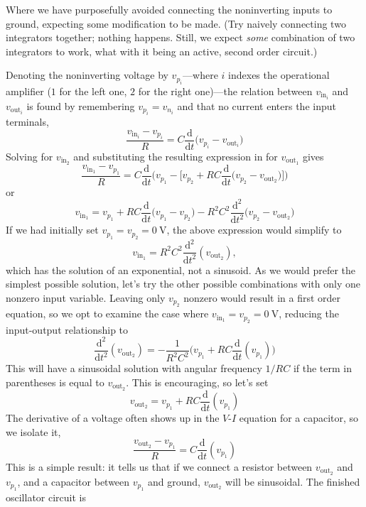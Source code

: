 \documentclass{article}
\begin{document}
	Where we have purposefully avoided connecting the noninverting inputs to ground, expecting some modification to be made. (Try naively connecting two integrators together; nothing happens. Still, we expect \textit{some} combination of two integrators to work, what with it being an active, second order circuit.)
	
	Denoting the noninverting voltage by $v_{p_i}$---where $i$ indexes the operational amplifier ($1$ for the left one, $2$ for the right one)---the relation between $v_{\text{in}_i}$ and $v_{\text{out}_i}$ is found by remembering $v_{p_i} = v_{n_i}$ and that no current enters the input terminals,
	\[
		\frac{v_{\text{in}_i} - v_{p_i}}{R} = C\frac{\mathrm{d}}{\mathrm{d}t}\Big(v_{p_i} - v_{\text{out}_i}\Big)
	\]
	Solving for $v_{\text{in}_2}$ and substituting the resulting expression in for $v_{\text{out}_1}$ gives
	\[
		\frac{v_{\text{in}_1} - v_{p_1}}{R} = C\frac{\mathrm{d}}{\mathrm{d}t}\Big(v_{p_1} - \Big[v_{p_2} + RC\frac{\mathrm{d}}{\mathrm{d}t}\Big(v_{p_2} - v_{\text{out}_2}\Big)\Big]\Big)
	\]
	or
	\[
		v_{\text{in}_1} = v_{p_1} + RC\frac{\mathrm{d}}{\mathrm{d}t}\Big(v_{p_1} - v_{p_2}\Big) - R^2C^2\frac{\mathrm{d}^2}{\mathrm{d}t^2}\Big(v_{p_2} - v_{\text{out}_2}\Big)
	\]
	If we had initially set $v_{p_1}=v_{p_2}=\SI{0}{\volt}$, the above expression would simplify to
	\[
		v_{\text{in}_1} = R^2C^2\frac{\mathrm{d}^2}{\mathrm{d}t^2}(v_{\text{out}_2}),
	\]
	which has the solution of an exponential, not a sinusoid. As we would prefer the simplest possible solution, let's try the other possible combinations with only one nonzero input variable. Leaving only $v_{p_2}$ nonzero would result in a first order equation, so we opt to examine the case where $v_{\text{in}_1} = v_{p_2} = \SI{0}{\volt}$, reducing the input-output relationship to
	\[
		 \frac{\mathrm{d}^2}{\mathrm{d}t^2}(v_{\text{out}_2}) = -\frac{1}{R^2C^2}\Big(v_{p_1} + RC\frac{\mathrm{d}}{\mathrm{d}t}(v_{p_1})\Big)
	\]
	This will have a sinusoidal solution with angular frequency $1/RC$ if the term in parentheses is equal to $v_{\text{out}_2}$. This is encouraging, so let's set
	\[
		v_{\text{out}_2} = v_{p_1} + RC\frac{\mathrm{d}}{\mathrm{d}t}(v_{p_1})
	\]
	The derivative of a voltage often shows up in the $V$-$I$ equation for a capacitor, so we isolate it,
	\[
		\frac{v_{\text{out}_2} - v_{p_1}}{R} = C\frac{\mathrm{d}}{\mathrm{d}t}(v_{p_1})
	\]
	This is a simple result: it tells us that if we connect a resistor between $v_{\text{out}_2}$ and $v_{p_1}$, and a capacitor between $v_{p_1}$ and ground, $v_{\text{out}_2}$ will be sinusoidal. The finished oscillator circuit is
	
\end{document}
